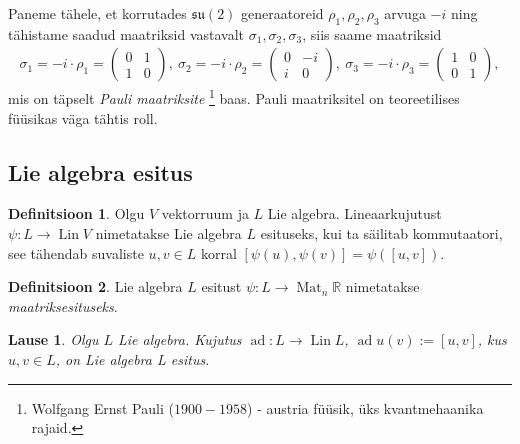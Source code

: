 \documentclass[12pt,a4paper,oneside]{article}
\theoremstyle{plain}
\newtheorem{lause}{Lause}[section]
\theoremstyle{definition}
\newtheorem{definitsioon}{Definitsioon}[section]
\numberwithin{equation}{section}
\def\R{{\mathbb R}}
\def\su2{{\mathfrak{ su}\left(2\right)}}
\DeclareMathOperator{\Mat}{Mat}
\DeclareMathOperator{\ad}{ad}
\DeclareMathOperator{\Lin}{Lin}
\begin{document}
Paneme tähele, et korrutades $\su2$ generaatoreid 
$\rho_1, \rho_2, \rho_3$ arvuga $-i$ ning tähistame saadud 
maatriksid vastavalt $\sigma_1, \sigma_2, \sigma_3$, siis saame 
maatriksid
\begin{align*}
\sigma_1 = -i \cdot \rho_1 = 
\begin{pmatrix} 0 & 1 \\ 1 & 0 \end{pmatrix}, \ 
\sigma_2 = -i \cdot \rho_2 = 
\begin{pmatrix} 0 & -i \\ i & 0 \end{pmatrix},\ 
\sigma_3 = -i \cdot \rho_3 = 
\begin{pmatrix} 1 & 0 \\ 0 & 1 \end{pmatrix},
\end{align*}
mis on täpselt \emph{Pauli maatriksite}
\footnote{Wolfgang Ernst Pauli ($1900 - 1958$) - austria füüsik, 
üks kvantmehaanika rajaid.} baas. Pauli maatriksitel on 
teoreetilises füüsikas väga tähtis roll.

\subsection{Lie algebra esitus}

\begin{definitsioon}
Olgu $V$ vektorruum ja $L$ Lie algebra. Lineaarkujutust 
$\psi : L \rightarrow \Lin V$ nimetatakse Lie algebra $L$ esituseks, 
kui ta säilitab kommutaatori, see tähendab suvaliste $u, v \in L$ 
korral $\left[\psi\left(u\right), \psi\left(v\right)\right] = 
\psi\left(\left[u, v\right]\right)$. 
\end{definitsioon}

\begin{definitsioon}
Lie algebra $L$ esitust $\psi : L \rightarrow \Mat_n \R$ nimetatakse 
\emph{maatriksesituseks}.
\end{definitsioon}

\begin{lause} \label{lause:adjoint}
Olgu $L$ Lie algebra. Kujutus $\ad : L \rightarrow \Lin L$, 
$\ad u \left(v\right) := \left[u, v\right]$, kus $u,v \in L$, 
on Lie algebra L esitus.
\end{lause}
\end{document}
